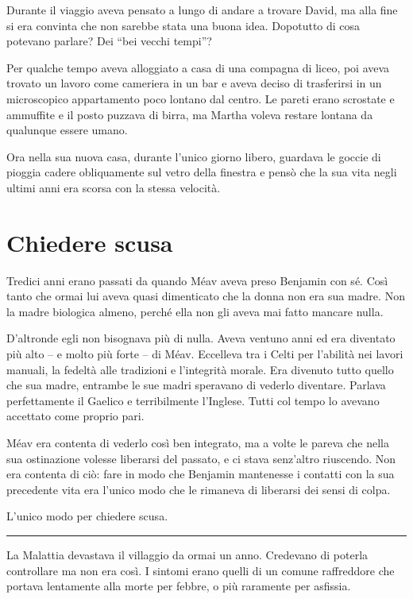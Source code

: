 \documentclass[a4paper,11pt,oneside,openright,final]{memoir}
\begin{document}
Durante il viaggio aveva pensato a lungo di andare a trovare David, ma alla fine
si era convinta che non sarebbe stata una buona idea. Dopotutto di cosa potevano
parlare? Dei ``bei vecchi tempi''?

Per qualche tempo aveva alloggiato a casa di una compagna di liceo, poi aveva
trovato un lavoro come cameriera in un bar e aveva deciso di trasferirsi in un
microscopico appartamento poco lontano dal centro. Le pareti erano scrostate e
ammuffite e il posto puzzava di birra, ma Martha voleva restare lontana da
qualunque essere umano.

Ora nella sua nuova casa, durante l'unico giorno libero, guardava le goccie di
pioggia cadere obliquamente sul vetro della finestra e pensò che la sua vita
negli ultimi anni era scorsa con la stessa velocità.

\chapter{Chiedere scusa}

Tredici anni erano passati da quando Méav aveva preso Benjamin con sé. Così
tanto che ormai lui aveva quasi dimenticato che la donna non era sua madre. Non
la madre biologica almeno, perché ella non gli aveva mai fatto mancare nulla.

D'altronde egli non bisognava più di nulla. Aveva ventuno anni ed era diventato
più alto -- e molto più forte -- di Méav. Eccelleva tra i Celti per
l'abilità nei lavori manuali, la fedeltà alle tradizioni e l'integrità
morale. Era divenuto tutto quello che sua madre, entrambe le sue madri speravano
di vederlo diventare. Parlava perfettamente il Gaelico e terribilmente
l'Inglese. Tutti col tempo lo avevano accettato come proprio pari.

Méav era contenta di vederlo così ben integrato, ma a volte le pareva che
nella sua ostinazione volesse liberarsi del passato, e ci stava senz'altro
riuscendo. Non era contenta di ciò: fare in modo che Benjamin mantenesse i
contatti con la sua precedente vita era l'unico modo che le rimaneva di
liberarsi dei sensi di colpa.

L'unico modo per chiedere scusa.

\plainbreak{1}

La Malattia devastava il villaggio da ormai un anno. Credevano di poterla
controllare ma non era così. I sintomi erano quelli di un comune raffreddore
che portava lentamente alla morte per febbre, o più raramente per asfissia.
\end{document}
